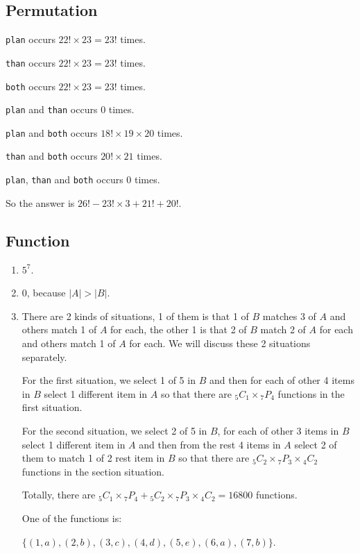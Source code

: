 \documentclass{../../cls/sig-alternate-05-2015}
\begin{document}
\subsection{Permutation}
\texttt{plan} occurs $22! \times 23 = 23!$ times.

\texttt{than} occurs $22! \times 23 = 23!$ times.

\texttt{both} occurs $22! \times 23 = 23!$ times.

\texttt{plan} and \texttt{than} occurs $0$ times.

\texttt{plan} and \texttt{both} occurs $18! \times 19 \times 20$ times.

\texttt{than} and \texttt{both} occurs $20! \times 21$ times.

\texttt{plan}, \texttt{than} and \texttt{both} occurs $0$ times.

So the answer is $26! - 23! \times 3 + 21! + 20!$.

\newpage

\subsection{Function}
\begin{enumerate}
	\item $5^7$.
	\item $0$, because $|A| > |B|$.
	\item There are 2 kinds of situations, 1 of them is that 1 of $B$ matches 3 of $A$ and others match 1 of $A$ for each, the other 1 is that 2 of $B$ match 2 of $A$ for each and others match 1 of $A$ for each. We will discuss these 2 situations separately.
	
	For the first situation, we select 1 of 5 in $B$ and then for each of other 4 items in $B$ select 1 different item in $A$ so that there are ${}_5 C_1 \times {}_7 P_4$ functions in the first situation.
	
	For the second situation, we select 2 of 5 in $B$, for each of other 3 items in $B$ select 1 different item in $A$ and then from the rest 4 items in $A$ select 2 of them to match 1 of 2 rest item in $B$ so that there are ${}_5 C_2 \times {}_7 P_3 \times {}_4 C_2$ functions in the section situation.
	
	Totally, there are ${}_5 C_1 \times {}_7 P_4 + {}_5 C_2 \times {}_7 P_3 \times {}_4 C_2 = 16800$ functions.
	
	One of the functions is: 
	
	$\{(1, a), (2, b), (3, c), (4, d), (5, e), (6, a), (7, b)\}$.
\end{enumerate}
\end{document}
